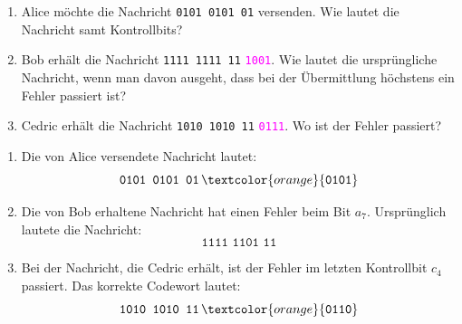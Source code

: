 \begin{myexercise}
\begin{center}
    \end{center}

    \begin{enumerate}
        \item Alice möchte die Nachricht
              \texttt{0101 0101 01} versenden.
              Wie lautet die Nachricht samt Kontrollbits?

        \item Bob erhält die Nachricht
              \texttt{1111 1111 11}
              \textcolor{magenta}{\texttt{1001}}.
              Wie lautet die ursprüngliche Nachricht,
              wenn man davon ausgeht, dass bei der
              Übermittlung höchstens ein Fehler
              passiert ist?

        \item Cedric erhält die Nachricht
              \texttt{1010 1010 11}
              \textcolor{magenta}{\texttt{0111}}.
              Wo ist der Fehler passiert?
    \end{enumerate}

    \begin{myanswer}
        \begin{enumerate}
            \item Die von Alice versendete Nachricht lautet:
                  \[
                      \texttt{0101 0101 01}\,
                      \textcolor{orange}{\texttt{0101}}
                  \]

            \item Die von Bob erhaltene Nachricht hat einen Fehler
                  beim Bit \(a_7\). Ursprünglich lautete die Nachricht:
                  \[
                      \texttt{1111 1101 11}
                  \]

            \item Bei der Nachricht, die Cedric erhält, ist der Fehler
                  im letzten Kontrollbit \(c_4\) passiert.
                  Das korrekte Codewort lautet:
                  \[
                      \texttt{1010 1010 11}\,
                      \textcolor{orange}{\texttt{0110}}
                  \]
        \end{enumerate}
    \end{myanswer}

\end{myexercise}



